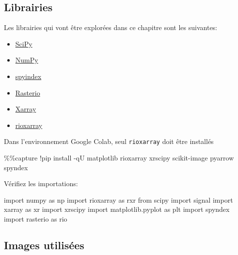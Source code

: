 \documentclass[
  french,
  11pt,
  letterpaper,
  open=any,
  twoside=false,
  french]{scrbook}
\newenvironment{Shaded}{\begin{snugshade}}{\end{snugshade}}
\newcommand{\ImportTok}[1]{\textcolor[rgb]{0.00,0.46,0.62}{#1}}
\newcommand{\NormalTok}[1]{\textcolor[rgb]{0.00,0.23,0.31}{#1}}
\newcommand{\OperatorTok}[1]{\textcolor[rgb]{0.37,0.37,0.37}{#1}}
\begin{document}
\subsection{Librairies}\label{librairies}

Les librairies qui vont être explorées dans ce chapitre sont les
suivantes:

\begin{itemize}
\item
  \href{https://scipy.org/}{SciPy}
\item
  \href{https://numpy.org/}{NumPy}
\item
  \href{https://github.com/awesome-spectral-indices/spyndex}{spyindex}
\item
  \href{https://rasterio.readthedocs.io/en/stable/}{Rasterio}
\item
  \href{https://docs.xarray.dev/en/stable/}{Xarray}
\item
  \href{https://corteva.github.io/rioxarray/stable/index.html}{rioxarray}
\end{itemize}

Dans l'environnement Google Colab, seul \texttt{rioxarray} doit être
installés

\begin{Shaded}
\begin{Highlighting}[]
\OperatorTok{\%\%}\NormalTok{capture}
\OperatorTok{!}\NormalTok{pip install }\OperatorTok{{-}}\NormalTok{qU matplotlib rioxarray xrscipy scikit}\OperatorTok{{-}}\NormalTok{image pyarrow spyndex}
\end{Highlighting}
\end{Shaded}

Vérifiez les importations:

\begin{Shaded}
\begin{Highlighting}[]
\ImportTok{import}\NormalTok{ numpy }\ImportTok{as}\NormalTok{ np}
\ImportTok{import}\NormalTok{ rioxarray }\ImportTok{as}\NormalTok{ rxr}
\ImportTok{from}\NormalTok{ scipy }\ImportTok{import}\NormalTok{ signal}
\ImportTok{import}\NormalTok{ xarray }\ImportTok{as}\NormalTok{ xr}
\ImportTok{import}\NormalTok{ xrscipy}
\ImportTok{import}\NormalTok{ matplotlib.pyplot }\ImportTok{as}\NormalTok{ plt}
\ImportTok{import}\NormalTok{ spyndex}
\ImportTok{import}\NormalTok{ rasterio }\ImportTok{as}\NormalTok{ rio}
\end{Highlighting}
\end{Shaded}

\subsection{Images utilisées}\label{images-utilisuxe9es}
\end{document}
